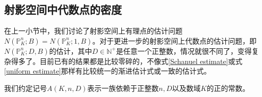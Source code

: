 

\subsection{射影空间中代数点的密度}
\label{counting algebraic points in Pn}
在上一小节中，我们讨论了射影空间上有理点的估计问题$N(\mathbb{P}^n_K;B) = N(\mathbb{P}^n_K;1,B)$。对于更进一步的射影空间上代数点的估计问题，即$N(\mathbb{P}^n_K;D,B)$的估计，其中$D\in \mathbb{N}^+$是任意一个正整数，情况就很不同了，变得复杂得多了。目前已有的结果都是比较零碎的，不像式\eqref{Schanuel estimate}或式\eqref{uniform estimate}那样有比较统一的渐进估计式或一致的估计式。

我们约定记号$A(K,n,D)$表示一族依赖于正整数$n,D$以及数域$K$的正的常数。

